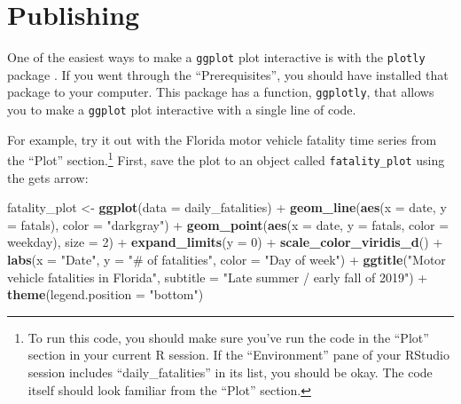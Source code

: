 \documentclass[]{tufte-book}
\newenvironment{Shaded}{}{}
\newcommand{\DataTypeTok}[1]{\textcolor[rgb]{0.56,0.13,0.00}{#1}}
\newcommand{\DecValTok}[1]{\textcolor[rgb]{0.25,0.63,0.44}{#1}}
\newcommand{\KeywordTok}[1]{\textcolor[rgb]{0.00,0.44,0.13}{\textbf{#1}}}
\newcommand{\NormalTok}[1]{#1}
\newcommand{\OperatorTok}[1]{\textcolor[rgb]{0.40,0.40,0.40}{#1}}
\newcommand{\StringTok}[1]{\textcolor[rgb]{0.25,0.44,0.63}{#1}}
\begin{document}
\hypertarget{publishing}{%
\section{Publishing}\label{publishing}}

One of the easiest ways to make a \texttt{ggplot} plot interactive is with the \texttt{plotly} package \citep{R-plotly}.
If you went through the ``Prerequisites'', you should have installed that package to your
computer. This package has a function, \texttt{ggplotly}, that allows you to make a \texttt{ggplot}
plot interactive with a single line of code.

For example, try it out with the Florida motor vehicle fatality time series from the ``Plot''
section.\footnote{To run this code, you should make sure you've run the code in the ``Plot'' section
  in your current R session. If the ``Environment'' pane of your RStudio session includes
  ``daily\_fatalities'' in its list, you should be okay. The code itself should look familiar from
  the ``Plot'' section.} First, save the plot to an object
called \texttt{fatality\_plot} using the gets arrow:

\begin{Shaded}
\begin{Highlighting}[]
\NormalTok{fatality_plot <-}\StringTok{ }\KeywordTok{ggplot}\NormalTok{(}\DataTypeTok{data =}\NormalTok{ daily_fatalities) }\OperatorTok{+}\StringTok{ }
\StringTok{    }\KeywordTok{geom_line}\NormalTok{(}\KeywordTok{aes}\NormalTok{(}\DataTypeTok{x =}\NormalTok{ date, }\DataTypeTok{y =}\NormalTok{ fatals), }\DataTypeTok{color =} \StringTok{"darkgray"}\NormalTok{) }\OperatorTok{+}\StringTok{ }
\StringTok{    }\KeywordTok{geom_point}\NormalTok{(}\KeywordTok{aes}\NormalTok{(}\DataTypeTok{x =}\NormalTok{ date, }\DataTypeTok{y =}\NormalTok{ fatals, }\DataTypeTok{color =}\NormalTok{ weekday), }
        \DataTypeTok{size =} \DecValTok{2}\NormalTok{) }\OperatorTok{+}\StringTok{ }\KeywordTok{expand_limits}\NormalTok{(}\DataTypeTok{y =} \DecValTok{0}\NormalTok{) }\OperatorTok{+}\StringTok{ }\KeywordTok{scale_color_viridis_d}\NormalTok{() }\OperatorTok{+}\StringTok{ }
\StringTok{    }\KeywordTok{labs}\NormalTok{(}\DataTypeTok{x =} \StringTok{"Date"}\NormalTok{, }\DataTypeTok{y =} \StringTok{"# of fatalities"}\NormalTok{, }\DataTypeTok{color =} \StringTok{"Day of week"}\NormalTok{) }\OperatorTok{+}\StringTok{ }
\StringTok{    }\KeywordTok{ggtitle}\NormalTok{(}\StringTok{"Motor vehicle fatalities in Florida"}\NormalTok{, }
        \DataTypeTok{subtitle =} \StringTok{"Late summer / early fall of 2019"}\NormalTok{) }\OperatorTok{+}\StringTok{ }
\StringTok{    }\KeywordTok{theme}\NormalTok{(}\DataTypeTok{legend.position =} \StringTok{"bottom"}\NormalTok{)}
\end{Highlighting}
\end{Shaded}
\end{document}
